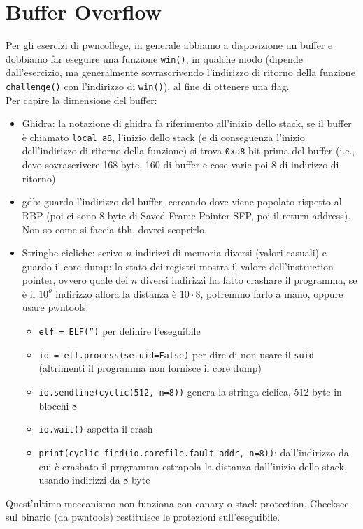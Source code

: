 
\section{Buffer Overflow}

Per gli esercizi di pwncollege, in generale abbiamo a disposizione un buffer e dobbiamo far eseguire una funzione \texttt{win()}, in qualche modo (dipende dall'esercizio, ma generalmente sovrascrivendo l'indirizzo di ritorno della funzione \texttt{challenge()} con l'indirizzo di \texttt{win()}), al fine di ottenere una flag.\\


Per capire la dimensione del buffer: 
\begin{itemize}
	\item Ghidra: la notazione di ghidra fa riferimento all'inizio dello stack, se il buffer è chiamato \texttt{local\_a8}, l'inizio dello stack (e di conseguenza l'inizio dell'indirizzo di ritorno della funzione) si trova \texttt{0xa8} bit prima del buffer (i.e., devo sovrascrivere 168 byte, 160 di buffer e cose varie poi 8 di indirizzo di ritorno)
	\item gdb: guardo l'indirizzo del buffer, cercando dove viene popolato rispetto al RBP (poi ci sono 8 byte di Saved Frame Pointer SFP, poi il return address). Non so come si faccia tbh, dovrei scoprirlo.
	\item Stringhe cicliche: scrivo $n$ indirizzi di memoria diversi (valori casuali) e guardo il core dump: lo stato dei registri mostra il valore dell'instruction pointer, ovvero quale dei $n$ diversi indirizzi ha fatto crashare il programma, se è il $10^o$ indirizzo allora la distanza è $10 \cdot 8$, potremmo farlo a mano, oppure usare pwntools:
	\begin{itemize}[label*=]
		\item \texttt{elf = ELF('')} per definire l'eseguibile
		\item \texttt{io = elf.process(setuid=False)} per dire di non usare il \texttt{suid} (altrimenti il programma non fornisce il core dump)
		\item \texttt{io.sendline(cyclic(512, n=8))} genera la stringa ciclica, 512 byte in blocchi 8
		\item \texttt{io.wait()} aspetta il crash
		\item \texttt{print(cyclic\_find(io.corefile.fault\_addr, n=8))}: dall'indirizzo da cui è crashato il programma estrapola la distanza dall'inizio dello stack, usando indirizzi da 8 byte
	\end{itemize}
\end{itemize}
Quest'ultimo  meccanismo non funziona con canary o stack protection. Checksec sul binario (da pwntools) restituisce le protezioni sull'eseguibile. \\


